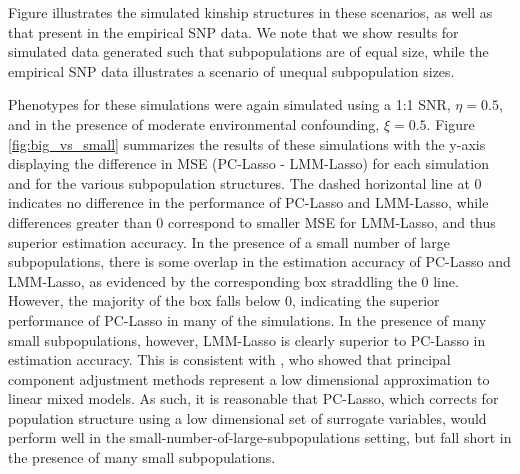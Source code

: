 Figure  illustrates the simulated kinship structures in these scenarios, as well as that present in the empirical SNP data. We note that we show results for simulated data generated such that subpopulations are of equal size, while the empirical SNP data illustrates a scenario of unequal subpopulation sizes.


Phenotypes for these simulations were again simulated using a 1:1 SNR, $\eta = 0.5$, and in the presence of moderate environmental confounding, $\xi = 0.5$. Figure \ref{fig:big_vs_small} summarizes the results of these simulations with the y-axis displaying the difference in MSE (PC-Lasso - LMM-Lasso) for each simulation and for the various subpopulation structures. The dashed horizontal line at 0 indicates no difference in the performance of PC-Lasso and LMM-Lasso, while differences greater than 0 correspond to smaller MSE for LMM-Lasso, and thus superior estimation accuracy. In the presence of a small number of large subpopulations, there is some overlap in the estimation accuracy of PC-Lasso and LMM-Lasso, as evidenced by the corresponding box straddling the 0 line. However, the majority of the box falls below 0, indicating the superior performance of PC-Lasso in many of the simulations. In the presence of many small subpopulations, however, LMM-Lasso is clearly superior to PC-Lasso in estimation accuracy. This is consistent with \citep{hoffman2013correcting}, who showed that principal component adjustment methods represent a low dimensional approximation to linear mixed models. As such, it is reasonable that PC-Lasso, which corrects for population structure using a low dimensional set of surrogate variables, would perform well in the small-number-of-large-subpopulations setting, but fall short in the presence of many small subpopulations. 


